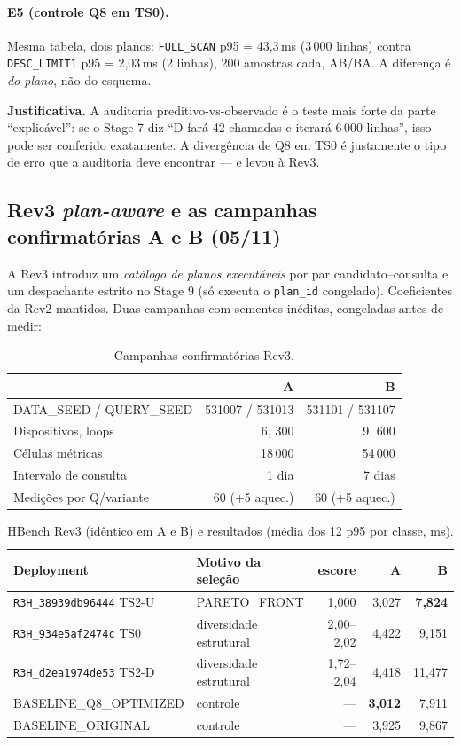 \documentclass[11pt,a4paper]{article}
\newcommand{\caixa}[2][boxbg]{\par\smallskip\noindent\colorbox{#1}{\parbox{\dimexpr\linewidth-2\fboxsep}{#2}}\par\smallskip}
\newcommand{\just}[1]{\caixa{\textbf{Justificativa.} #1}}
\begin{document}
\paragraph{E5 (controle Q8 em TS0).} Mesma tabela, dois planos: \texttt{FULL\_SCAN} p95 = 43,3\,ms (3\,000 linhas) contra \texttt{DESC\_LIMIT1} p95 = 2,03\,ms (2 linhas), 200 amostras cada, AB/BA. A diferença é \emph{do plano}, não do esquema.

\just{A auditoria preditivo-vs-observado é o teste mais forte da parte ``explicável'': se o Stage 7 diz ``D fará 42 chamadas e iterará 6\,000 linhas'', isso pode ser conferido exatamente. A divergência de Q8 em TS0 é justamente o tipo de erro que a auditoria deve encontrar --- e levou à Rev3.}

\subsection{Rev3 \emph{plan-aware} e as campanhas confirmatórias A e B (05/11)}
A Rev3 introduz um \emph{catálogo de planos executáveis} por par candidato--consulta e um despachante estrito no Stage 9 (só executa o \texttt{plan\_id} congelado). Coeficientes da Rev2 mantidos. Duas campanhas com sementes inéditas, congeladas antes de medir:

\begin{table}[H]\centering\small
\caption{Campanhas confirmatórias Rev3.}
\begin{tabular}{@{}lrr@{}}\toprule
 & A & B\\\midrule
DATA\_SEED / QUERY\_SEED & 531007 / 531013 & 531101 / 531107\\
Dispositivos, loops & 6, 300 & 9, 600\\
Células métricas & 18\,000 & 54\,000\\
Intervalo de consulta & 1 dia & 7 dias\\
Medições por Q/variante & 60 (+5 aquec.) & 60 (+5 aquec.)\\\bottomrule
\end{tabular}\end{table}

\begin{table}[H]\centering\small
\caption{HBench Rev3 (idêntico em A e B) e resultados (média dos 12 p95 por classe, ms).}
\begin{tabular}{@{}llrrr@{}}\toprule
Deployment & Motivo da seleção & escore & A & B\\\midrule
\texttt{R3H\_38939db96444} TS2-U & PARETO\_FRONT & 1,000 & 3,027 & \textbf{7,824}\\
\texttt{R3H\_934e5af2474c} TS0 & diversidade estrutural & 2,00--2,02 & 4,422 & 9,151\\
\texttt{R3H\_d2ea1974de53} TS2-D & diversidade estrutural & 1,72--2,04 & 4,418 & 11,477\\\midrule
BASELINE\_Q8\_OPTIMIZED & controle & --- & \textbf{3,012} & 7,911\\
BASELINE\_ORIGINAL & controle & --- & 3,925 & 9,867\\\bottomrule
\end{tabular}\end{table}
\end{document}
